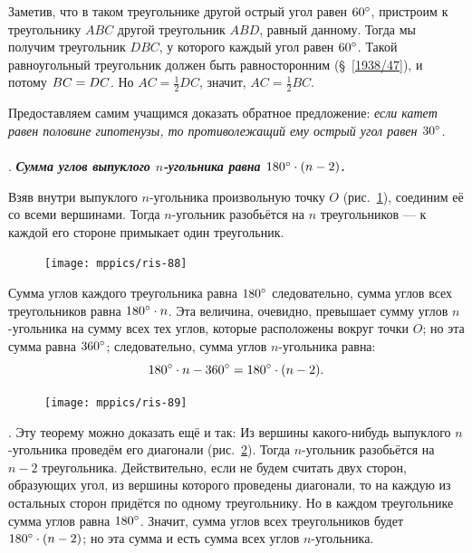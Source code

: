 Заметив, что в таком треугольнике другой острый угол равен $60\degree$, пристроим к треугольнику $ABC$ другой треугольник $ABD$, равный данному.
Тогда мы получим треугольник $DBC$, у которого каждый угол равен $60\degree$.
Такой равноугольный треугольник должен быть равносторонним (§~\ref{1938/47}), и потому $BC\z=DC$.
Но $AC=\tfrac12DC$, значит, $AC=\tfrac12BC$.

Предоставляем самим учащимся доказать обратное предложение:
\emph{если катет равен половине гипотенузы, то противолежащий ему острый угол равен $30\degree$.}

\paragraph{}\label{1938/82}
.
\textbf{\emph{Сумма углов выпуклого $n$-угольника равна $180\degree\cdot(n-2)$.}}

Взяв внутри выпуклого $n$-угольника произвольную точку $O$ (рис.~\ref{1938/ris-88}), соединим её со всеми вершинами.
Тогда $n$-угольник разобьётся на $n$ треугольников — к каждой его стороне примыкает один треугольник.

\begin{figure}
\centering
\texttt{[image: mppics/ris-88]}
\caption{}\label{1938/ris-88}
\end{figure}

Сумма углов каждого треугольника равна $180\degree$ следовательно, сумма углов всех треугольников равна $180\degree\cdot n$.
Эта величина, очевидно, превышает сумму углов $n$-угольника на сумму всех тех углов, которые расположены вокруг точки $O$;
но эта сумма равна $360\degree$;
следовательно, сумма углов $n$-угольника равна:
\[180\degree\cdot n -360\degree = 180\degree\cdot(n - 2).\]

\begin{figure}
\centering
\texttt{[image: mppics/ris-89]}
\caption{}\label{1938/ris-89}
\end{figure}


\smallskip
\mbox{.}
Эту теорему можно доказать ещё и так:
Из вершины какого-нибудь выпуклого $n$-угольника проведём его диагонали (рис.~\ref{1938/ris-89}).
Тогда $n$-угольник разобьётся на $n-2$ треугольника.
Действительно, если не будем считать двух сторон, образующих угол, из вершины которого проведены диагонали, то на каждую из остальных сторон придётся по одному треугольнику.
Но в каждом треугольнике сумма углов равна $180\degree$.
Значит, сумма углов всех треугольников будет $180\degree\cdot(n-2)$;
но эта сумма и есть сумма всех углов $n$-угольника.

